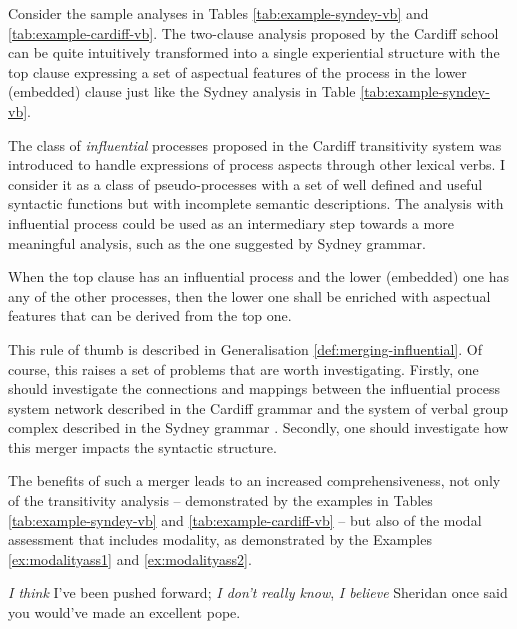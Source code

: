     Consider the sample analyses in Tables \ref{tab:example-syndey-vb} and \ref{tab:example-cardiff-vb}. The two-clause analysis proposed by the Cardiff school can be quite intuitively transformed into a single experiential structure with the top clause expressing a set of aspectual features of the process in the lower (embedded) clause just like the Sydney analysis in Table \ref{tab:example-syndey-vb}. 

    The class of \textit{influential} processes proposed in the Cardiff transitivity system was introduced to handle expressions of process aspects through other lexical verbs. I consider it as a class of pseudo-processes with a set of well defined and useful syntactic functions but with incomplete semantic descriptions. The analysis with influential process could be used as an intermediary step towards a more meaningful analysis, such as the one suggested by Sydney grammar. 

    \begin{generalization} \label{def:merging-influential}
    	When the top clause has an influential process and the lower (embedded) one has any of the other processes, then the lower one shall be enriched with aspectual features that can be derived from the top one.
    \end{generalization}

    This rule of thumb is described in Generalisation \ref{def:merging-influential}. Of course, this raises a set of problems that are worth investigating. Firstly, one should investigate the connections and mappings between the influential process system network described in the Cardiff grammar and the system of verbal group complex described in the Sydney grammar \citep[p.589]{Halliday2013}. Secondly, one should investigate how this merger impacts the syntactic structure. 

    The benefits of such a merger leads to an increased comprehensiveness, not only of the transitivity analysis -- demonstrated by the examples in Tables \ref{tab:example-syndey-vb} and \ref{tab:example-cardiff-vb} -- but also of the modal assessment that includes modality, as demonstrated by the Examples \ref{ex:modalityass1} and \ref{ex:modalityass2}. 

    \begin{exe}
    	\ex\label{ex:modalityass1} \textit{I think} I've been pushed forward; \textit{I don't really know}, \citep[p.183]{Halliday2013}
    	\ex\label{ex:modalityass2} \textit{I believe} Sheridan once said you would've made an excellent pope. \citep[p.182]{Halliday2013}
    \end{exe}

